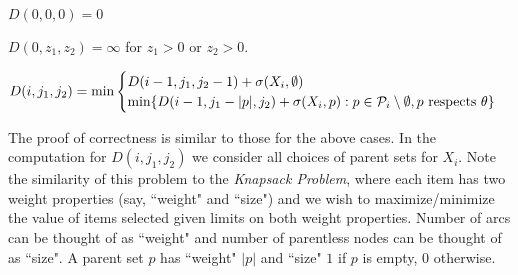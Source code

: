 \documentclass[twoside,11pt]{article}
\begin{document}
 \bigskip{}
$D(0, 0, 0) = 0$

$D(0, z_1, z_2) = \infty$ for $z_1 > 0$ or $z_2 > 0$. 

\begin{equation}
    D(i, j_1, j_2) = \text{min}
    \begin{cases}
      D(i-1, j_1, j_2-1) + \sigma(X_i, \emptyset)\\
      \text{min} \{ D(i-1, j_1 - |p|, j_2) + \sigma(X_i, p) : p \in \mathcal{P}_i \setminus \emptyset, \text{$ p$ respects }\theta \}
    \end{cases}
  \end{equation}

\bigskip{}
The proof of correctness is similar to those for the above cases. In the computation for $D(i, j_1, j_2)$ we consider all choices of parent sets for $X_i$. Note the similarity of this problem to the \textit{Knapsack Problem}, where each item has two weight properties (say, ``weight" and ``size") and we wish to maximize/minimize the value of items selected given limits on both weight properties. Number of arcs can be thought of as ``weight" and number of parentless nodes can be thought of as ``size". A parent set $p$ has ``weight" $|p|$ and ``size" $1$ if $p$ is empty, $0$ otherwise. 
\end{document}
